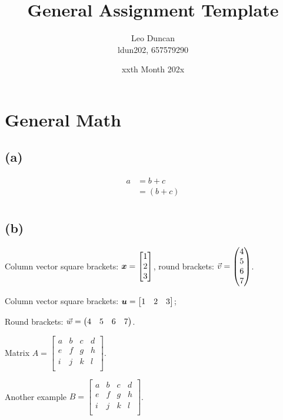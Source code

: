 \documentclass[11pt, a4paper]{article}
\title{General Assignment Template}
\author{Leo Duncan \\ ldun202, 657579290}
\date{xxth Month 202x}
\begin{document}
\maketitle

\section{General Math}

\subsection{(a)} %

\begin{equation*}
    \begin{split}
        a &= b + c \\
        &= (b + c) \\
    \end{split}
\end{equation*}

\subsection{(b)} %

Column vector square brackets: $\bm{x} = \begin{bmatrix}1\\2\\3\end{bmatrix}$, round brackets: $\vec{v} = \begin{pmatrix}4\\5\\6\\7\end{pmatrix}$.

Column vector square brackets: $\bm{u} = \begin{bmatrix}1&2&3\end{bmatrix}$;

Round brackets: $\vec{w} = \begin{pmatrix}4&5&6&7\end{pmatrix}$.

Matrix $A = \left[\begin{array}{cccc}
    a & b & c & d \\
    e & f & g & h \\
    i & j & k & l \\
\end{array}\right]$.

Another example $B = \left[\begin{array}{ccc|c}
    a & b & c & d \\
    e & f & g & h \\
    i & j & k & l \\
\end{array}\right]$.
\end{document}
